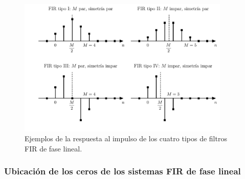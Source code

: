 \documentclass[a4paper]{report}
\begin{document}
\begin{figure}[!htb]
 \begin{center}
 \includegraphics[width=0.9\textwidth]{figuras/transform_analysis_lineal_phase_fir_types.pdf}
 \caption{\label{fig:transform_analysis_lineal_phase_fir_types} Ejemplos de la respuesta al impulso de los cuatro tipos de filtros FIR de fase lineal.}
 \end{center}
\end{figure} 

\subsubsection{Ubicación de los ceros de los sistemas FIR de fase lineal}
\end{document}
